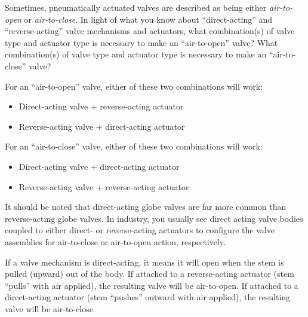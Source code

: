 

Sometimes, pneumatically actuated valves are described as being either {\it air-to-open} or {\it air-to-close}.  In light of what you know about ``direct-acting'' and ``reverse-acting'' valve mechanisms and actuators, what combination(s) of valve type and actuator type is necessary to make an ``air-to-open'' valve?  What combination(s) of valve type and actuator type is necessary to make an ``air-to-close'' valve?







For an ``air-to-open'' valve, either of these two combinations will work:

\begin{itemize}
\item{} Direct-acting valve + reverse-acting actuator
\item{} Reverse-acting valve + direct-acting actuator
\end{itemize}

\vskip 10pt

For an ``air-to-close'' valve, either of these two combinations will work:

\begin{itemize}
\item{} Direct-acting valve + direct-acting actuator
\item{} Reverse-acting valve + reverse-acting actuator
\end{itemize}

\vskip 10pt

It should be noted that direct-acting globe valves are far more common than reverse-acting globe valves.  In industry, you usually see direct acting valve bodies coupled to either direct- or reverse-acting actuators to configure the valve assemblies for air-to-close or air-to-open action, respectively.







If a valve mechanism is direct-acting, it means it will open when the stem is pulled (upward) out of the body.  If attached to a reverse-acting actuator (stem ``pulls'' with air applied), the resulting valve will be air-to-open.  If attached to a direct-acting actuator (stem ``pushes'' outward with air applied), the resulting valve will be air-to-close.

